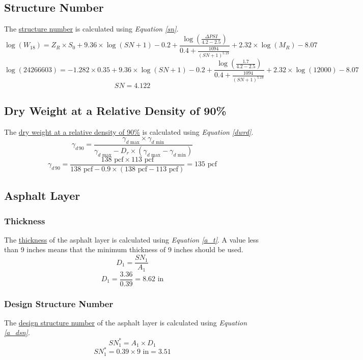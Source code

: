 \documentclass{article}
\begin{document}
\subsection{Structure Number}
\noindent The \underline{structure number} is calculated using \emph{Equation \ref{sn}}.
\begin{equation}\label{sn}\log(W_{18})=Z_R\times S_0+9.36\times\log(SN+1)-0.2+\frac{\log\left(\frac{\Delta PSI}{4.2-2.5}\right)}{0.4+\frac{1094}{(SN+1)^{5.19}}}+2.32\times\log(M_R)-8.07\end{equation}
\[\log(24266603)=-1.282\times 0.35+9.36\times\log(SN+1)-0.2+\frac{\log\left(\frac{1.7}{4.2-2.5}\right)}{0.4+\frac{1094}{(SN+1)^{5.19}}}+2.32\times\log(12000)-8.07\]
\[SN=\boxed{4.122}\]
\subsection{Dry Weight at a Relative Density of 90\%}
\noindent The \underline{dry weight at a relative density of 90\%} is calculated using \emph{Equation \ref{dwrd}}.
\begin{equation}\label{dwrd}\gamma_{d\,90}=\frac{\gamma_{d\text{ max}}\times \gamma_{d\text{ min}}}{\gamma_{d\text{ max}}-D_r\times(\gamma_{d\text{ max}}-\gamma_{d\text{ min}})}\end{equation}
\[\gamma_{d\,90}=\frac{138\text{ pcf}\times 113\text{ pcf}}{138\text{ pcf}-0.9\times(138\text{ pcf}-113\text{ pcf})}=\boxed{135\text{ pcf}}\]

\subsection{Asphalt Layer}
\subsubsection{Thickness}
\noindent The \underline{thickness} of the asphalt layer is calculated using \emph{Equation \ref{a_t}}. A value less than 9 inches means that the minimum thickness of 9 inches should be used. 
\begin{equation}\label{a_t}D_1=\frac{SN_1}{A_1}\end{equation}
\[D_1=\frac{3.36}{0.39}=\boxed{8.62 \text{ in}}\]
\subsubsection{Design Structure Number} 
\noindent The \underline{design structure number} of the asphalt layer is calculated using \emph{Equation \ref{a_dsn}}.
\begin{equation}\label{a_dsn}SN_1^*=A_1\times D_1\end{equation}
\[SN_1^*=0.39\times 9\text{ in}=\boxed{3.51}\]
\end{document}
